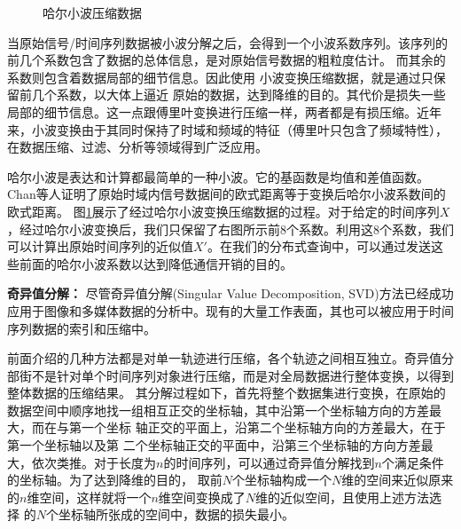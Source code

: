 \begin{figure} [t]
	\centering
	\caption{哈尔小波压缩数据\cite{KeoghDimReduction}}
	\label{fig-chapter2-haar}
\end{figure}
当原始信号/时间序列数据被小波分解之后，会得到一个小波系数序列。该序列的前几个系数包含了数据的总体信息，是对原始信号数据的粗粒度估计。
而其余的系数则包含着数据局部的细节信息。因此使用 小波变换压缩数据，就是通过只保留前几个系数，以大体上逼近 原始的数据，达到降维的目的。其代价是损失一些局部的细节信息。这一点跟傅里叶变换进行压缩一样，两者都是有损压缩。近年来，小波变换由于其同时保持了时域和频域的特征（傅里叶只包含了频域特性），在数据压缩、过滤、分析等领域得到广泛应用。

哈尔小波是表达和计算都最简单的一种小波。它的基函数是均值和差值函数。
Chan等人证明了原始时域内信号数据间的欧式距离等于变换后哈尔小波系数间的欧式距离\cite{chan2003haar}。
图\ref{fig-chapter2-haar}展示了经过哈尔小波变换压缩数据的过程。对于给定的时间序列$X$，经过哈尔小波变换后，我们只保留了右图所示前8个系数。利用这8个系数，我们可以计算出原始时间序列的近似值$X'$。在我们的分布式查询中，可以通过发送这些前面的哈尔小波系数以达到降低通信开销的目的。

\textbf{奇异值分解：}
尽管奇异值分解(Singular Value Decomposition, SVD)方法已经成功应用于图像和多媒体数据的分析中。现有的大量工作表面，其也可以被应用于时间序列数据的索引和压缩中。

前面介绍的几种方法都是对单一轨迹进行压缩，各个轨迹之间相互独立。奇异值分部街不是针对单个时间序列对象进行压缩，而是对全局数据进行整体变换，以得到整体数据的压缩结果。
其分解过程如下，首先将整个数据集进行变换，在原始的数据空间中顺序地找一组相互正交的坐标轴，其中沿第一个坐标轴方向的方差最大，而在与第一个坐标 轴正交的平面上，沿第二个坐标轴方向的方差最大，在于第一个坐标轴以及第 二个坐标轴正交的平面中，沿第三个坐标轴的方向方差最大，依次类推。对于长度为$n$的时间序列，可以通过奇异值分解找到$n$个满足条件的坐标轴。为了达到降维的目的，
取前$N$个坐标轴构成一个$N$维的空间来近似原来的$n$维空间，这样就将一个$n$维空间变换成了$N$维的近似空间，且使用上述方法选择 的$N$个坐标轴所张成的空间中，数据的损失最小。

